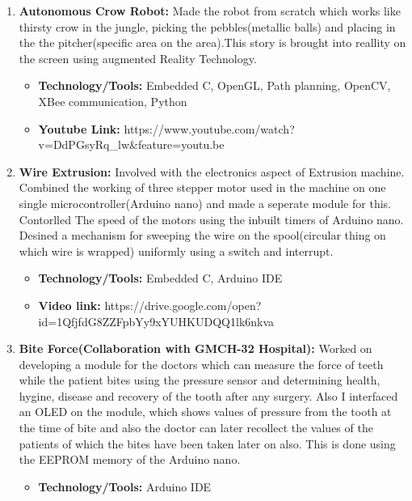\documentclass[letterpaper,11pt]{article}
\newlength{\outerbordwidth}
\newcommand{\resheading}[1]{\vspace{8pt}
  \parbox{\textwidth}{\setlength{\FrameSep}{\outerbordwidth}
    \begin{shaded}
\setlength{\fboxsep}{0pt}\framebox[\textwidth][l]{\setlength{\fboxsep}{4pt}\fcolorbox{shadecolorB}{shadecolorB}{\textbf{\sffamily{\mbox{~}\makebox[6.762in][l]{\large #1} \vphantom{p\^{E}}}}}}
    \end{shaded}
  }\vspace{-5pt}
}
\begin{document}
\resheading{Projects}
 \begin{enumerate}

\item \textbf {Autonomous Crow Robot:}
Made the robot from scratch which works like thirsty crow in the jungle, picking the pebbles(metallic balls) and placing in the the pitcher(specific area on the area).This story is brought into reallity on the screen using augmented Reality Technology. 
\begin{itemize}
\item \textbf{Technology/Tools:} Embedded C, OpenGL, Path planning, OpenCV, XBee communication, Python 
\end{itemize}
\begin{itemize}
\item \textbf{Youtube Link:} https://www.youtube.com/watch?v=DdPGsyRq_lw&feature=youtu.be
\end{itemize}

\item \textbf {Wire Extrusion:}
Involved with the electronics aspect of Extrusion machine. Combined the working of three stepper motor used in the machine on one single microcontroller(Arduino nano) and made a seperate module for this. Contorlled The speed of the motors using the inbuilt timers of Arduino nano. Desined a mechanism for sweeping the wire on the spool(circular thing on which wire is wrapped) uniformly using a switch and interrupt. 

\begin{itemize}
\item \textbf{Technology/Tools:} Embedded C, Arduino IDE
\end{itemize}
\begin{itemize}
\item \textbf{Video link:} https://drive.google.com/open?id=1QfjfdG8ZZFpbYy9xYUHKUDQQ1lk6nkva
\end{itemize}

 
  \item \textbf{Bite Force(Collaboration with GMCH-32 Hospital):} 
Worked on developing a module for the doctors which can measure the force of teeth while the patient bites using the pressure sensor and determining  health, hygine, disease and recovery of the tooth after any surgery. Also I interfaced an OLED on the module, which shows values of pressure from the tooth at the time of bite and also the doctor can later recollect the values of the patients of which the bites have been taken later on also. This is done using the EEPROM memory of the Arduino nano.
\begin{itemize}
\item \textbf{Technology/Tools:} Arduino IDE
\end{itemize}


\end{enumerate}
\end{document}

